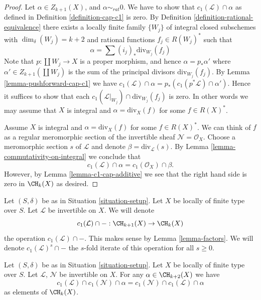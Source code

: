 \begin{proof}
Let $\alpha \in Z_{k + 1}(X)$, and $\alpha \sim_{rat} 0$.
We have to show that $c_1(\mathcal{L}) \cap \alpha$
as defined in Definition \ref{definition-cap-c1} is zero.
By Definition \ref{definition-rational-equivalence} there
exists a locally finite family $\{W_j\}$ of integral closed
subschemes with $\dim_\delta(W_j) = k + 2$ and rational functions
$f_j \in R(W_j)^*$ such that
$$
\alpha = \sum (i_j)_*\text{div}_{W_j}(f_j)
$$
Note that $p : \coprod W_j \to X$ is a proper morphism,
and hence $\alpha = p_*\alpha'$ where $\alpha' \in Z_{k + 1}(\coprod W_j)$
is the sum of the principal divisors $\text{div}_{W_j}(f_j)$.
By Lemma \ref{lemma-pushforward-cap-c1} we have
$c_1(\mathcal{L}) \cap \alpha = p_*(c_1(p^*\mathcal{L}) \cap \alpha')$.
Hence it suffices to show that each
$c_1(\mathcal{L}|_{W_j}) \cap \text{div}_{W_j}(f_j)$ is zero.
In other words we may assume that $X$ is integral and
$\alpha = \text{div}_X(f)$ for some $f \in R(X)^*$.

\medskip\noindent
Assume $X$ is integral and $\alpha = \text{div}_X(f)$ for some $f \in R(X)^*$.
We can think of $f$ as a regular meromorphic section of the invertible
sheaf $\mathcal{N} = \mathcal{O}_X$. Choose a meromorphic section
$s$ of $\mathcal{L}$ and denote $\beta = \text{div}_\mathcal{L}(s)$.
By Lemma \ref{lemma-commutativity-on-integral}
we conclude that
$$
c_1(\mathcal{L}) \cap \alpha = c_1(\mathcal{O}_X) \cap \beta.
$$
However, by Lemma \ref{lemma-c1-cap-additive} we see that the right hand side
is zero in $\CH_k(X)$ as desired.
\end{proof}

\noindent
Let $(S, \delta)$ be as in Situation \ref{situation-setup}.
Let $X$ be locally of finite type over $S$.
Let $\mathcal{L}$ be invertible on $X$.
We will denote
$$
c_1(\mathcal{L}) \cap - : \CH_{k + 1}(X) \to \CH_k(X)
$$
the operation $c_1(\mathcal{L}) \cap - $. This makes sense by
Lemma \ref{lemma-factors}. We will denote $c_1(\mathcal{L})^s \cap -$
the $s$-fold iterate of this operation for all $s \geq 0$.

\begin{lemma}
\label{lemma-cap-commutative}
Let $(S, \delta)$ be as in Situation \ref{situation-setup}.
Let $X$ be locally of finite type over $S$.
Let $\mathcal{L}$, $\mathcal{N}$ be invertible on $X$.
For any $\alpha \in \CH_{k + 2}(X)$ we have
$$
c_1(\mathcal{L}) \cap c_1(\mathcal{N}) \cap \alpha
=
c_1(\mathcal{N}) \cap c_1(\mathcal{L}) \cap \alpha
$$
as elements of $\CH_k(X)$.
\end{lemma}

